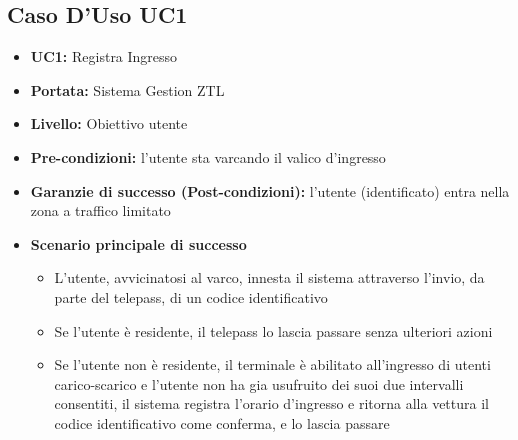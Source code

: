 \documentclass[12pt, letterpaper]{article}
\begin{document}
\subsection{Caso D'Uso UC1}
\begin{itemize}
    \item \textbf{UC1:} Registra Ingresso
    \item \textbf{Portata:} Sistema Gestion ZTL
    \item \textbf{Livello:} Obiettivo utente
    \item \textbf{Pre-condizioni:} l'utente sta varcando 
    il valico d'ingresso
    \item \textbf{Garanzie di successo (Post-condizioni):} 
    l'utente (identificato) entra nella zona a traffico 
    limitato
    
    \item \textbf{Scenario principale di successo}
    \begin{itemize}
        \item L'utente, avvicinatosi al varco, 
        innesta il sistema attraverso l'invio, 
        da parte del telepass, di un codice 
        identificativo
        \item Se l'utente è residente, 
        il telepass lo lascia passare senza 
        ulteriori azioni
        \item Se l'utente non è residente, 
        il terminale è abilitato all'ingresso 
        di utenti carico-scarico e l'utente non 
        ha gia usufruito dei suoi due intervalli 
        consentiti, il sistema registra l'orario 
        d'ingresso e ritorna alla vettura il codice 
        identificativo come conferma, e lo lascia 
        passare
    \end{itemize}
    

\end{itemize}
\end{document}
